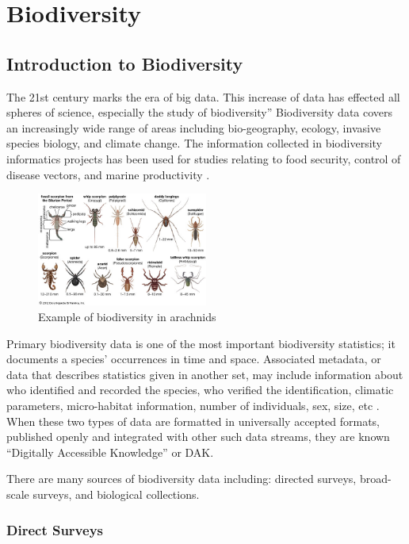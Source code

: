 \chapter{Biodiversity}
\section{Introduction to Biodiversity}

The 21st century marks the era of big data.
This increase of data has effected all spheres of science, especially the study of biodiversity''
Biodiversity data covers an increasingly wide range of areas including bio-geography, ecology, invasive species biology, and climate change.
The information collected in biodiversity informatics projects has been used for studies relating to food security, control of disease vectors, and marine productivity \cite{Barve}.  
\begin{figure}[htbp!] 
   \centering
   \includegraphics[width=0.5\textwidth]{pictures/biodiversity/spiders.jpg} 
   \caption{Example of biodiversity in arachnids}
   \label{fig:arachnids}
\end{figure}

Primary biodiversity data is one of the most important biodiversity statistics; it documents a species' occurrences in time and space.
Associated metadata, or data that describes statistics given in another set, may include information about who identified and recorded the species, who verified the identification, climatic parameters, micro-habitat information, number of individuals, sex, size, etc \cite{Barve}.
When these two types of data are formatted in universally accepted formats, published openly and integrated with other such data streams, they are known ``Digitally Accessible Knowledge'' or DAK.

There are many sources of biodiversity data including: directed surveys, broad-scale surveys, and biological collections. 

\subsection{Direct Surveys}

